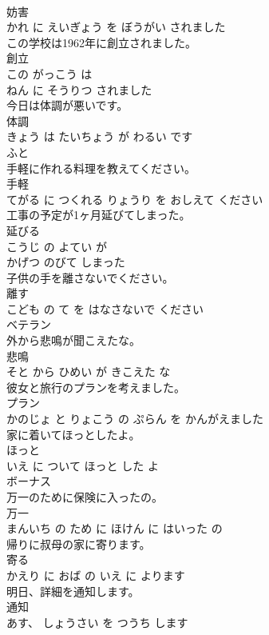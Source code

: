\documentclass[8pt]{extreport}
\begin{document}
\begin{CJK}{UTF8}{min}
\\	妨害 
\\	かれ に えいぎょう を ぼうがい されました			
\\	この学校は1962年に創立されました。	
\\	創立 
\\	この がっこう は 
\\	ねん に そうりつ されました			
\\	今日は体調が悪いです。	
\\	体調 
\\	きょう は たいちょう が わるい です			
\\	ふと	
\\	手軽に作れる料理を教えてください。	
\\	手軽 
\\	てがる に つくれる りょうり を おしえて ください			
\\	工事の予定が1ヶ月延びてしまった。	
\\	延びる 
\\	こうじ の よてい が 
\\	かげつ のびて しまった			
\\	子供の手を離さないでください。	
\\	離す 
\\	こども の て を はなさないで ください			
\\	ベテラン	
\\	外から悲鳴が聞こえたな。	
\\	悲鳴 
\\	そと から ひめい が きこえた な			
\\	彼女と旅行のプランを考えました。	
\\	プラン 
\\	かのじょ と りょこう の ぷらん を かんがえました			
\\	家に着いてほっとしたよ。	
\\	ほっと 
\\	いえ に ついて ほっと した よ			
\\	ボーナス	
\\	万一のために保険に入ったの。	
\\	万一 
\\	まんいち の ため に ほけん に はいった の			
\\	帰りに叔母の家に寄ります。	
\\	寄る 
\\	かえり に おば の いえ に よります			
\\	明日、詳細を通知します。	
\\	通知 
\\	あす、 しょうさい を つうち します			

\end{CJK}
\end{document}

